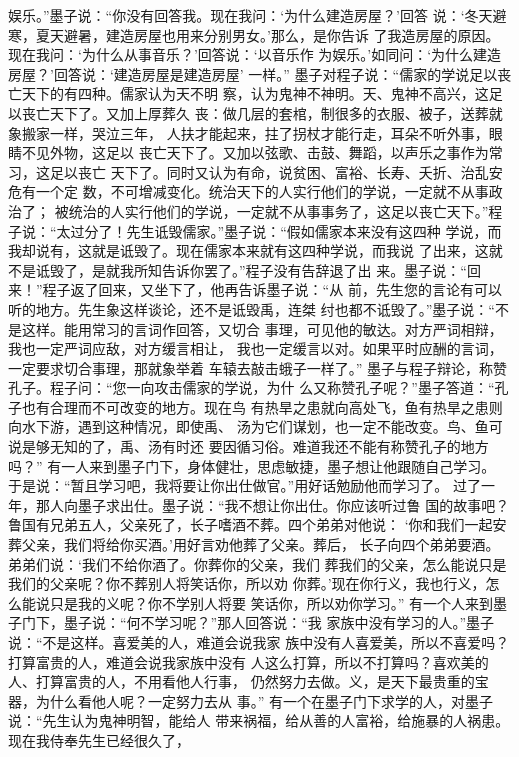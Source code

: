 \documentclass[12pt,UTF8]{ctexbook}
\begin{document}
娱乐。”墨子说：“你没有回答我。现在我问：‘为什么建造房屋？’回答 
说：‘冬天避寒，夏天避暑，建造房屋也用来分别男女。’那么，是你告诉 
了我造房屋的原因。现在我问：‘为什么从事音乐？’回答说：‘以音乐作 
为娱乐。’如同问：‘为什么建造房屋？’回答说：‘建造房屋是建造房屋’ 
一样。” 
墨子对程子说：“儒家的学说足以丧亡天下的有四种。儒家认为天不明 
察，认为鬼神不神明。天、鬼神不高兴，这足以丧亡天下了。又加上厚葬久 
丧：做几层的套棺，制很多的衣服、被子，送葬就象搬家一样，哭泣三年， 
人扶才能起来，拄了拐杖才能行走，耳朵不听外事，眼睛不见外物，这足以 
丧亡天下了。又加以弦歌、击鼓、舞蹈，以声乐之事作为常习，这足以丧亡 
天下了。同时又认为有命，说贫困、富裕、长寿、夭折、治乱安危有一个定 
数，不可增减变化。统治天下的人实行他们的学说，一定就不从事政治了； 
被统治的人实行他们的学说，一定就不从事事务了，这足以丧亡天下。”程 
子说：“太过分了！先生诋毁儒家。”墨子说：“假如儒家本来没有这四种 
学说，而我却说有，这就是诋毁了。现在儒家本来就有这四种学说，而我说 
了出来，这就不是诋毁了，是就我所知告诉你罢了。”程子没有告辞退了出 
来。墨子说：“回来！”程子返了回来，又坐下了，他再告诉墨子说：“从 
前，先生您的言论有可以听的地方。先生象这样谈论，还不是诋毁禹，连桀 
纣也都不诋毁了。”墨子说：“不是这样。能用常习的言词作回答，又切合 
事理，可见他的敏达。对方严词相辩，我也一定严词应敌，对方缓言相让， 
我也一定缓言以对。如果平时应酬的言词，一定要求切合事理，那就象举着 
车辕去敲击蛾子一样了。” 
墨子与程子辩论，称赞孔子。程子问：“您一向攻击儒家的学说，为什 
么又称赞孔子呢？”墨子答道：“孔子也有合理而不可改变的地方。现在鸟 
有热旱之患就向高处飞，鱼有热旱之患则向水下游，遇到这种情况，即使禹、 
汤为它们谋划，也一定不能改变。鸟、鱼可说是够无知的了，禹、汤有时还 
要因循习俗。难道我还不能有称赞孔子的地方吗？” 
有一人来到墨子门下，身体健壮，思虑敏捷，墨子想让他跟随自己学习。 
于是说：“暂且学习吧，我将要让你出仕做官。”用好话勉励他而学习了。 
过了一年，那人向墨子求出仕。墨子说：“我不想让你出仕。你应该听过鲁 
国的故事吧？鲁国有兄弟五人，父亲死了，长子嗜酒不葬。四个弟弟对他说： 
‘你和我们一起安葬父亲，我们将给你买酒。’用好言劝他葬了父亲。葬后， 
长子向四个弟弟要酒。弟弟们说：‘我们不给你酒了。你葬你的父亲，我们 
葬我们的父亲，怎么能说只是我们的父亲呢？你不葬别人将笑话你，所以劝 
你葬。’现在你行义，我也行义，怎么能说只是我的义呢？你不学别人将要 
笑话你，所以劝你学习。” 
有一个人来到墨子门下，墨子说：“何不学习呢？”那人回答说：“我 
家族中没有学习的人。”墨子说：“不是这样。喜爱美的人，难道会说我家 
族中没有人喜爱美，所以不喜爱吗？打算富贵的人，难道会说我家族中没有 
人这么打算，所以不打算吗？喜欢美的人、打算富贵的人，不用看他人行事， 
仍然努力去做。义，是天下最贵重的宝器，为什么看他人呢？一定努力去从 
事。” 
有一个在墨子门下求学的人，对墨子说：“先生认为鬼神明智，能给人 
带来祸福，给从善的人富裕，给施暴的人祸患。现在我侍奉先生已经很久了， 
\end{document}
